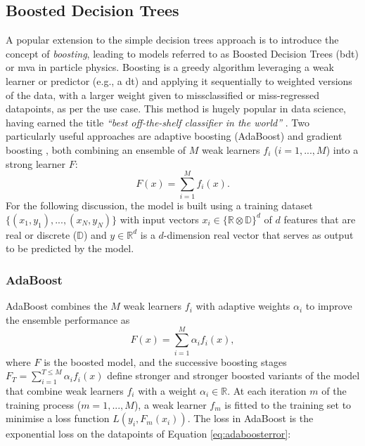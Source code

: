 \subsection{Boosted Decision Trees}
A popular extension to the simple decision trees approach is to introduce the concept of \textit{boosting}, leading to models referred to as Boosted Decision Trees (\gls{bdt}) or \gls{mva} in particle physics. Boosting is a greedy algorithm leveraging a weak learner or predictor (e.g., a \gls{dt}) and applying it sequentially to weighted versions of the data, with a larger weight given to missclassified or miss-regressed datapoints, as per the use case. This method is hugely popular in data science, having earned the title \textit{``best off-the-shelf classifier in the world''} \cite{baggingML}. Two particularly useful approaches are adaptive boosting (AdaBoost) \cite{Adaboost} and gradient boosting \cite{gradientBoosting}, both combining an ensemble of $M$ weak learners $f_i$ ($i = 1, ..., M$) into a strong learner $F$: \[F(x) = \sum_{i=1}^M f_i(x).\] For the following discussion, the model is built using a training dataset $ \{(x_1, y_1), ..., (x_N, y_N)\}$ with input vectors $x_i \in \{\mathbb{R} \otimes \mathbb{D}\}^d$ of $d$ features that are real or discrete ($\mathbb{D}$) and $y \in \mathbb{R}^d$ is a $d$-dimension real vector that serves as output to be predicted by the model.

\subsubsection{AdaBoost}\label{sub-adaboosted}
AdaBoost combines the $M$ weak learners $f_i$ with adaptive weights $\alpha_i$ to improve the ensemble performance as \[F(x) = \sum_{i=1}^M \alpha_i f_i(x),\] where $F$ is the boosted model, and the successive boosting stages $F_T = \sum_{i=1}^{T \leq M} \alpha_i f_i(x)$ define stronger and stronger boosted variants of the model that combine weak learners $f_i$ with a weight $\alpha_i \in \mathbb{R}$. At each iteration $m$ of the training process ($m = 1, ..., M$), a weak learner $f_m$ is fitted to the training set to minimise a loss function $L(y_i, F_{m}(x_i))$. The loss in AdaBoost is the exponential loss on the datapoints of Equation \ref{eq:adaboosterror}:

